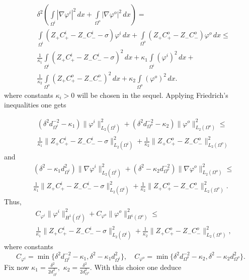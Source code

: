 \documentclass{amsart}
\begin{document}
\begin{equation}\label{normsfi}
\begin{aligned}
&\delta^2\left(\int\limits_{\Omega^i}|\nabla {\varphi^i}|^2\,dx+\int\limits_{\Omega^o}|\nabla {\varphi^o}|^2\,dx\right)=\\
&\int\limits_{\Omega^i}\left(Z_{+}C^i_{+}-Z_{-}C^i_{-}-\sigma\right){ \varphi}^i\,dx+\int\limits_{\Omega^o}\left(Z_{+}C^o_{+}-Z_{-}C^o_{-}\right){ \varphi}^o\,dx\leq \\
&\frac{1}{\kappa_1}\int\limits_{\Omega^i}\left(Z_{+}C^i_{+}-Z_{-}C^i_{-}-\sigma\right)^2\,dx+\kappa_1\int\limits_{\Omega^i}\left({ \varphi}^i\right)^2\,dx+\\
&\frac{1}{\kappa_2}\int\limits_{\Omega^o}\left(Z_{+}C^o_{+}-Z_{-}C^o_{-}\right)^2\,dx+\kappa_2\int\limits_{\Omega^o}\left({ \varphi}^o\right)^2\,dx.
\end{aligned}
\end{equation}
where constants $\kappa_i>0$  will be chosen in the sequel. Applying Friedrich's inequalities one gets


 \begin{equation}\label{normsfiL_2}
\begin{aligned}
&(\delta^2d^{-2}_{\Omega^i}-\kappa_1)\|\varphi^i\|^2_{L_2(\Omega^i)}+(\delta^2d^{-2}_{\Omega^o}-\kappa_2)\|\varphi^o\|^2_{L_2(\Omega^o)}\leq \\
&\frac{1}{\kappa_1}\|Z_{+}C^i_{+}-Z_{-}C^i_{-}-\sigma\|^2_{L_2(\Omega^i)} +\frac{1}{\kappa_2}\|Z_{+}C^o_{+}-Z_{-}C^o_{-}\|^2_{L_2(\Omega^o)}
\end{aligned}
\end{equation}
and
 \begin{equation}\label{normsfigradL_2}
\begin{aligned}
&(\delta^2-\kappa_1d^2_{\Omega^i})\|\nabla \varphi^i\|^2_{L_2(\Omega^i)}+(\delta^2-\kappa_2d^{-2}_{\Omega^o})\|\nabla \varphi^o\|^2_{L_2(\Omega^o)}\leq\\
&\frac{1}{\kappa_1}\|Z_{+}C^i_{+}-Z_{-}C^i_{-}-\sigma\|^2_{L_2(\Omega^i)} +\frac{1}{\kappa_2}\|Z_{+}C^o_{+}-Z_{-}C^o_{-}\|^2_{L_2(\Omega^o)}.
\end{aligned}
\end{equation}
Thus,
 \begin{equation}\label{normsfiH1}
\begin{aligned}
&C_{\varphi^i}\|\varphi^i\|^2_{H^1(\Omega^i)}+C_{\varphi^o}\|\varphi^o\|^2_{H^1(\Omega^o)}\leq  \\
&\frac{1}{\kappa_1}\|Z_{+}C^i_{+}-Z_{-}C^i_{-}-\sigma\|^2_{L_2(\Omega^i)} +\frac{1}{\kappa_2}\|Z_{+}C^o_{+}-Z_{-}C^o_{-}\|^2_{L_2(\Omega^o)},
\end{aligned}
\end{equation}
where constants $$C_{\varphi^i}=\min\{\delta^2d^{-2}_{\Omega^i}-\kappa_1,\delta^2-\kappa_1d^2_{\Omega^i}\}, \quad C_{\varphi^o}=\min\{\delta^2d^{-2}_{\Omega^o}-\kappa_2,\delta^2-\kappa_2d^2_{\Omega^o}\}.$$
Fix now $\kappa_1=\frac{\delta^2}{2d^2_{\Omega^i}},$ $\kappa_2=\frac{\delta^2}{2d^2_{\Omega^o}}.$ With this choice one deduce
\end{document}
